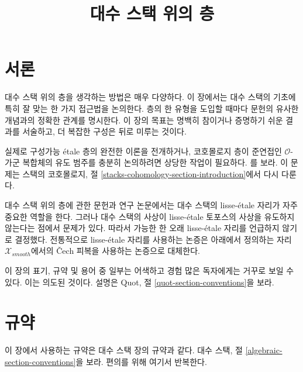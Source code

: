 

%


\title{대수 스택 위의 층}


\maketitle

\label{section-phantom}

\tableofcontents

\section{서론}
\label{section-introduction}

\noindent
대수 스택 위의 층을 생각하는 방법은 매우 다양하다.
이 장에서는 대수 스택의 기초에 특히 잘 맞는 한 가지 접근법을 논의한다.
층의 한 유형을 도입할 때마다 문헌의 유사한 개념과의 정확한 관계를
명시한다.
이 장의 목표는 명백히 참이거나 증명하기 쉬운 결과를 서술하고,
더 복잡한 구성은 뒤로 미루는 것이다.

\medskip\noindent
실제로 구성가능 \'etale 층의 완전한 이론을 전개하거나,
코호몰로지 층이 준연접인 $\mathcal{O}$-가군 복합체의 유도 범주를
충분히 논의하려면 상당한 작업이 필요하다. \cite{olsson_sheaves}를
보라. 이 문제는 스택의 코호몰로지, 절
\ref{stacks-cohomology-section-introduction}에서 다시 다룬다.

\medskip\noindent
대수 스택 위의 층에 관한 문헌과 연구 논문에서는 대수 스택의
lisse-\'etale 자리가 자주 중요한 역할을 한다. 그러나 대수 스택의
사상이 lisse-\'etale 토포스의 사상을 유도하지 않는다는 점에서
문제가 있다. 따라서 가능한 한 오래 lisse-\'etale 자리를 언급하지
않기로 결정했다. 전통적으로 lisse-\'etale 자리를 사용하는 논증은
아래에서 정의하는 자리 $\mathcal{X}_{smooth}$에서의 {\v C}ech
피복을 사용하는 논증으로 대체한다.

\medskip\noindent
이 장의 표기, 규약 및 용어 중 일부는 어색하고 경험 많은 독자에게는
거꾸로 보일 수 있다. 이는 의도된 것이다. 설명은 Quot, 절
\ref{quot-section-conventions}을 보라.




\section{규약}
\label{section-conventions}

\noindent
이 장에서 사용하는 규약은 대수 스택 장의 규약과 같다. 대수 스택,
절 \ref{algebraic-section-conventions}을 보라.
편의를 위해 여기서 반복한다.


